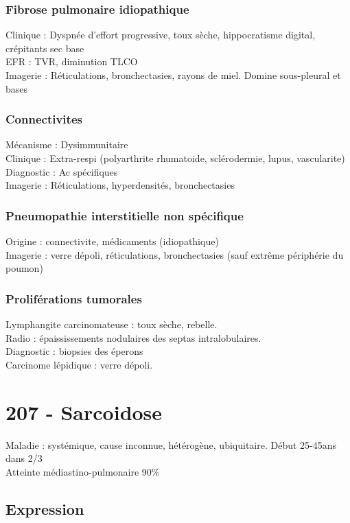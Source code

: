 \subsubsection{Fibrose pulmonaire idiopathique}
Clinique : Dyspnée d'effort progressive, toux sèche, hippocratisme digital, crépitants sec base\\
EFR : TVR, diminution TLCO\\
Imagerie : Réticulations, bronchectasies, rayons de miel. Domine sous-pleural et bases

\subsubsection{Connectivites}
Mécanisme : Dysimmunitaire\\
Clinique : Extra-respi (polyarthrite rhumatoide, sclérodermie, lupus, vascularite)\\
Diagnostic : Ac spécifiques\\
Imagerie : Réticulations, hyperdensités, bronchectasies

\subsubsection{Pneumopathie interstitielle non spécifique}
Origine : connectivite, médicaments (idiopathique)\\
Imagerie : verre dépoli, réticulations, bronchectasies (sauf extrême périphérie du poumon)

\subsubsection{Proliférations tumorales}
Lymphangite carcinomateuse : toux sèche, rebelle. \\
Radio : épaississements nodulaires des septas intralobulaires.\\
Diagnostic : biopsies des éperons\\
Carcinome lépidique : verre dépoli. 


\section{207 - Sarcoidose}
Maladie : systémique, cause inconnue, hétérogène, ubiquitaire. Début 25-45ans
dans 2/3\\
Atteinte médiastino-pulmonaire 90\%

\subsection{Expression}
\label{sec:org39048da}
